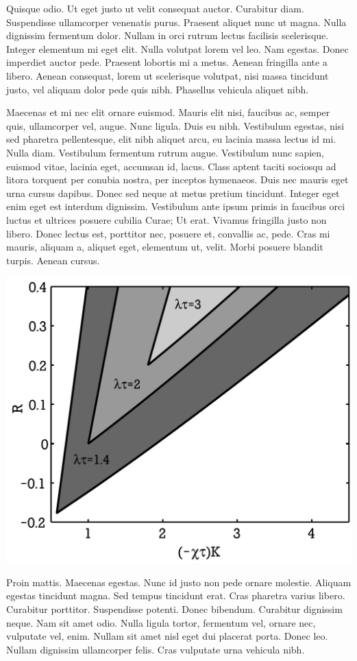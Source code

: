 \documentclass[colorbacktitle,accentcolor=tud9c]{tudposter}
\begin{document}
\begin{multicols}{3}
    Quisque odio. Ut eget justo ut velit consequat auctor. Curabitur diam. Suspendisse ullamcorper venenatis purus. Praesent aliquet nunc ut magna. Nulla dignissim fermentum dolor. Nullam in orci rutrum lectus facilisis scelerisque. Integer elementum mi eget elit. Nulla volutpat lorem vel leo. Nam egestas. Donec imperdiet auctor pede. Praesent lobortis mi a metus. Aenean fringilla ante a libero. Aenean consequat, lorem ut scelerisque volutpat, nisi massa tincidunt justo, vel aliquam dolor pede quis nibh. Phasellus vehicula aliquet nibh.

    Maecenas et mi nec elit ornare euismod. Mauris elit nisi, faucibus ac, semper quis, ullamcorper vel, augue. Nunc ligula. Duis eu nibh. Vestibulum egestas, nisi sed pharetra pellentesque, elit nibh aliquet arcu, eu lacinia massa lectus id mi. Nulla diam. Vestibulum fermentum rutrum augue. Vestibulum nunc sapien, euismod vitae, lacinia eget, accumsan id, lacus. Class aptent taciti sociosqu ad litora torquent per conubia nostra, per inceptos hymenaeos. Duis nec mauris eget urna cursus dapibus. Donec sed neque at metus pretium tincidunt. Integer eget enim eget est interdum dignissim. Vestibulum ante ipsum primis in faucibus orci luctus et ultrices posuere cubilia Curae; Ut erat. Vivamus fringilla justo non libero. Donec lectus est, porttitor nec, posuere et, convallis ac, pede. Cras mi mauris, aliquam a, aliquet eget, elementum ut, velit. Morbi posuere blandit turpis. Aenean cursus.

    {\centering\includegraphics[clip,width=0.9\linewidth]{TUDposter-fig}}

    Proin mattis. Maecenas egestas. Nunc id justo non pede ornare molestie. Aliquam egestas tincidunt magna. Sed tempus tincidunt erat. Cras pharetra varius libero. Curabitur porttitor. Suspendisse potenti. Donec bibendum. Curabitur dignissim neque. Nam sit amet odio. Nulla ligula tortor, fermentum vel, ornare nec, vulputate vel, enim. Nullam sit amet nisl eget dui placerat porta. Donec leo. Nullam dignissim ullamcorper felis. Cras vulputate urna vehicula nibh.
    

\end{multicols}
\end{document}
